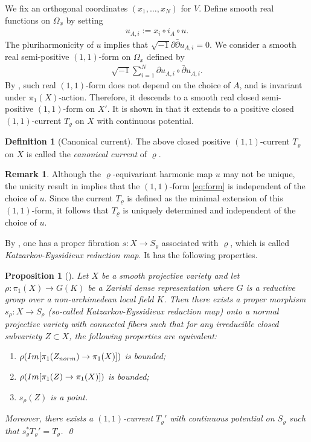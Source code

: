 \documentclass[11pt,a4paper,english]{smfart}
\theoremstyle{plain}
\newtheorem{proposition}[theorem]{Proposition}
\theoremstyle{definition}
\newtheorem{definition}[theorem]{Definition}
\newtheorem{remark}[theorem]{Remark}
\theoremstyle{plain}
\def\hess{\sqrt{-1}\partial\bar{\partial}}
\def\db{\bar{\partial}}
\begin{document}
 We fix  an orthogonal coordinates $(x_1,\ldots,x_N)$ for $V$.  Define   smooth real functions on $\Omega_x$ by setting
\begin{align}\label{eq:ui}
 u_{A,i}:=x_i\circ i_A\circ u.
\end{align}   The pluriharmonicity of $u$ implies that $\hess u_{A,i}=0$. We consider a smooth real semi-positive $(1,1)$-form on $\Omega_x$ defined by 
\begin{align}\label{eq:form}
   \sqrt{-1}\sum_{i=1}^{N}\partial u_{A,i}\circ \db u_{A,i}. 
 \end{align}
By \cite[\S 3.3.2]{Eys04},  such real $(1,1)$-form does not depend on the choice of $A$, and is invariant under $\pi_1(X)$-action. Therefore, it descends to a smooth real closed semi-positive $(1,1)$-form on $X'$.  
 It is shown in \cite{Eys04} that it extends to a  positive closed $(1,1)$-current $T_{\varrho}$  on $X$ with continuous potential.  
\begin{definition}[Canonical current]\label{def:canonical}
	The above closed positive $(1,1)$-current 	$T_\varrho$ on $X$ is called the \emph{canonical current} of $\varrho$.   
\end{definition}  
\begin{remark}
	Although the $\varrho$-equivariant harmonic map $u$ may not be unique, the unicity result in \cite{DM24} implies that the  $(1,1)$-form \eqref{eq:form} is independent of the choice of $u$. Since the current $T_\varrho$ is defined as the minimal extension of this $(1,1)$-form, it follows that $T_\varrho$ is uniquely determined and independent of the choice of $u$.
\end{remark}
By \cite{Eys04,CDY22,DY23}, one has  a proper fibration  $s:X\to S_{\varrho}$ associated with $\varrho$,  which is called \emph{Katzarkov-Eyssidieux reduction map}. It has the following properties. 
\begin{proposition}[\cite{Eys04,CDY22}]\label{thm:KE}
	Let $X$ be a smooth projective variety and let $\rho:\pi_1(X)\to G(K)$ be a  Zariski dense representation where $G$ is a reductive group over  a non-archimedean local field $K$.  Then there exists a proper morphism $s_\rho:X\to S_\rho$ (so-called Katzarkov-Eyssidieux reduction map) onto a normal projective variety with connected fibers  such that  for any irreducible closed subvariety $Z\subset X$, the following properties are equivalent: 
	\begin{enumerate}
		\item\label{item:KZ1} $\rho({\rm Im}[\pi_1(Z_{\rm norm})\to \pi_1(X)])$ is bounded;
		\item \label{item:KZ3} $\rho({\rm Im}[\pi_1(Z)\to \pi_1(X)])$ is bounded;
		\item \label{item:KZ2}  $s_\rho(Z)$ is a point.
	\end{enumerate}  
	Moreover, there exists a $(1,1)$-current $T_\varrho'$ with continuous potential on $S_\varrho$ such that $s_\varrho^*T_\varrho'=T_\varrho$. \qed
\end{proposition}
\end{document}

